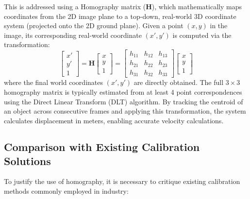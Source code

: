 This is addressed using a Homography matrix ($\mathbf{H}$), which mathematically maps coordinates from the 2D image plane to a top-down, real-world 3D coordinate system (projected onto the 2D ground plane). Given a point $(x, y)$ in the image, its corresponding real-world coordinate $(x', y')$ is computed via the transformation:
\begin{equation}
\begin{bmatrix} x' \\ y' \\ 1 \end{bmatrix} = \mathbf{H} \begin{bmatrix} x \\ y \\ 1 \end{bmatrix} = \begin{bmatrix} h_{11} & h_{12} & h_{13} \\ h_{21} & h_{22} & h_{23} \\ h_{31} & h_{32} & h_{33} \end{bmatrix} \begin{bmatrix} x \\ y \\ 1 \end{bmatrix}
\end{equation}
where the final world coordinates $(x', y')$ are directly obtained. The full $3 \times 3$ homography matrix is typically estimated from at least 4 point correspondences using the Direct Linear Transform (DLT) algorithm. By tracking the centroid of an object across consecutive frames and applying this transformation, the system calculates displacement in meters, enabling accurate velocity calculations.

\subsection{Comparison with Existing Calibration Solutions}
To justify the use of homography, it is necessary to critique existing calibration methods commonly employed in industry:

